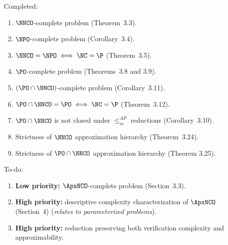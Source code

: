 Completed:
\begin{enumerate}
\item $\NNCO$-complete problem (Theorem~3.3).
\item $\NPO$-complete problem (Corollary~3.4).
\item $\NNCO = \NPO \iff \NC = \P$ (Theorem~3.5).

\item $\PO$-complete problem (Theorems~3.8 and 3.9).
\item $(\PO \cap \NNCO)$-complete problem (Corollary~3.11).
\item $\PO \cap \NNCO = \PO \iff \NC = \P$ (Theorem~3.12).

\item $\PO \cap \NNCO$ is not closed under $\leq_m^{AP}$ reductions (Corollary~3.10).

\item Strictness of $\NNCO$ approximation hierarchy (Theorem~3.24).
\item Strictness of $\PO \cap \NNCO$ approximation hierarchy (Theorem 3.25).
\end{enumerate}
To-do:
\begin{enumerate}
\item \textbf{Low priority:} $\ApxNCO$-complete problem (Section~3.3).
\item \textbf{High priority:} descriptive complexity characterization of $\ApxNCO$ (Section~4) (\emph{relates to parameterized problems}).
\item \textbf{High priority:} reduction preserving both verification complexity and approximability.
\end{enumerate}

